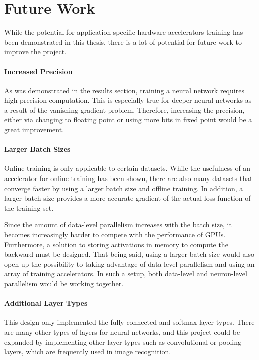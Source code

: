 \section{Future Work}
While the potential for application-specific hardware accelerators training has been demonstrated in this thesis, there is a lot of potential for future work to improve the project.

\paragraph{Increased Precision}
As was demonstrated in the results section, training a neural network requires high precision computation. This is especially true for deeper neural networks as a result of the vanishing gradient problem. Therefore, increasing the precision, either via changing to floating point or using more bits in fixed point would be a great improvement.

\paragraph{Larger Batch Sizes}
Online training is only applicable to certain datasets. While the usefulness of an accelerator for online training has been shown, there are also many datasets that converge faster by using a larger batch size and offline training. In addition, a larger batch size provides a more accurate gradient of the actual loss function of the training set. 

Since the amount of data-level parallelism increases with the batch size, it becomes increasingly harder to compete with the performance of GPUs. Furthermore, a solution to storing activations in memory to compute the backward must be designed. That being said, using a larger batch size would also open up the possibility to taking advantage of data-level parallelism and using an array of training accelerators. In such a setup, both data-level and neuron-level parallelism would be working together.

\paragraph{Additional Layer Types}
This design only implemented the fully-connected and softmax layer types. There are many other types of layers for neural networks, and this project could be expanded by implementing other layer types such as convolutional or pooling layers, which are  frequently used in image recognition.

